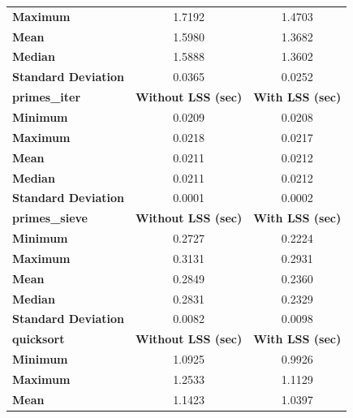 \documentclass[a4paper,UKenglish,cleveref, autoref, thm-restate]{template/lipics-v2021}
\begin{document}
\begin{appendices}
\begin{table}
\begin{tabular}{l|c c}
      \textbf{Maximum}            & 1.7192                     & 1.4703                  \\
      \textbf{Mean}               & 1.5980                     & 1.3682                  \\
      \textbf{Median}             & 1.5888                     & 1.3602                  \\
      \textbf{Standard Deviation} & 0.0365                     & 0.0252                  \\
      \hline
      \textbf{primes\_iter}       & \textbf{Without LSS (sec)} & \textbf{With LSS (sec)} \\
      \hline
      \textbf{Minimum}            & 0.0209                     & 0.0208                  \\
      \textbf{Maximum}            & 0.0218                     & 0.0217                  \\
      \textbf{Mean}               & 0.0211                     & 0.0212                  \\
      \textbf{Median}             & 0.0211                     & 0.0212                  \\
      \textbf{Standard Deviation} & 0.0001                     & 0.0002                  \\
      \hline
      \textbf{primes\_sieve}      & \textbf{Without LSS (sec)} & \textbf{With LSS (sec)} \\
      \hline
      \textbf{Minimum}            & 0.2727                     & 0.2224                  \\
      \textbf{Maximum}            & 0.3131                     & 0.2931                  \\
      \textbf{Mean}               & 0.2849                     & 0.2360                  \\
      \textbf{Median}             & 0.2831                     & 0.2329                  \\
      \textbf{Standard Deviation} & 0.0082                     & 0.0098                  \\
      \hline
      \textbf{quicksort}          & \textbf{Without LSS (sec)} & \textbf{With LSS (sec)} \\
      \hline
      \textbf{Minimum}            & 1.0925                     & 0.9926                  \\
      \textbf{Maximum}            & 1.2533                     & 1.1129                  \\
      \textbf{Mean}               & 1.1423                     & 1.0397                  \\

\end{tabular}
\end{table}
\end{appendices}
\end{document}
